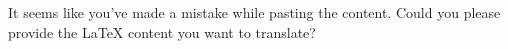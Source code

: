 It seems like you've made a mistake while pasting the content. Could you please provide the LaTeX content you want to translate?
